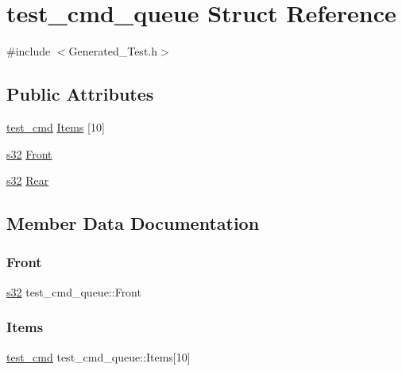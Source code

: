 \hypertarget{structtest__cmd__queue}{}\section{test\+\_\+cmd\+\_\+queue Struct Reference}
\label{structtest__cmd__queue}


{\ttfamily \#include $<$Generated\+\_\+\+Test.\+h$>$}

\subsection*{Public Attributes}
\begin{DoxyCompactItemize}
\item 
\hyperlink{PreprocTest_8h_a55ed691059222a58555cf9992ec14431}{test\+\_\+cmd} \hyperlink{structtest__cmd__queue_a893fe182353a750337200b5aad9bacb3}{Items} \mbox{[}10\mbox{]}
\item 
\hyperlink{ab__common_8h_ae9b1af5c037e57a98884758875d3a7c4}{s32} \hyperlink{structtest__cmd__queue_a20ed55b6b8b836106c001539d2e3d599}{Front}
\item 
\hyperlink{ab__common_8h_ae9b1af5c037e57a98884758875d3a7c4}{s32} \hyperlink{structtest__cmd__queue_a7cedef36f33507cbadf3f4ef95aa7cec}{Rear}
\end{DoxyCompactItemize}


\subsection{Member Data Documentation}
\mbox{\label{structtest__cmd__queue_a20ed55b6b8b836106c001539d2e3d599}} 
\subsubsection{\texorpdfstring{Front}{Front}}
{\footnotesize\ttfamily \hyperlink{ab__common_8h_ae9b1af5c037e57a98884758875d3a7c4}{s32} test\+\_\+cmd\+\_\+queue\+::\+Front}

\mbox{\label{structtest__cmd__queue_a893fe182353a750337200b5aad9bacb3}} 
\subsubsection{\texorpdfstring{Items}{Items}}
{\footnotesize\ttfamily \hyperlink{PreprocTest_8h_a55ed691059222a58555cf9992ec14431}{test\+\_\+cmd} test\+\_\+cmd\+\_\+queue\+::\+Items\mbox{[}10\mbox{]}}


